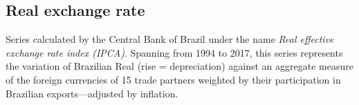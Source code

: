 \subsection{Real exchange rate}
Series calculated by the Central Bank of Brazil under the name \textit{Real effective exchange rate index (IPCA)}. Spanning from 1994 to 2017, this series represents the variation of Brazilian Real (rise = depreciation) against an aggregate measure of the foreign currencies of 15 trade partners weighted by their participation in Brazilian exports---adjusted by inflation.

